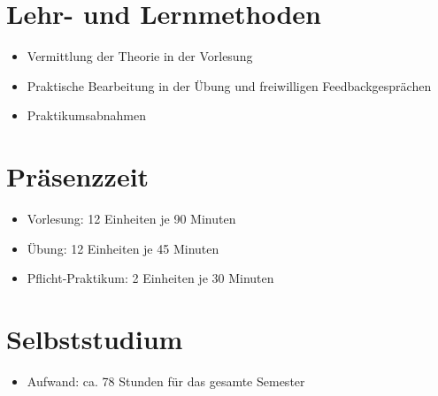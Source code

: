 \hypertarget{lehr--und-lernmethodenpathlabel....srcmodulbeschreibungen-bachelor-bpo5ba_datenbanksysteme}{%
\section*{Lehr- und
Lernmethoden\label{../../src/modulbeschreibungen-bachelor-bpo5/BA_Datenbanksysteme}}\label{lehr--und-lernmethodenpathlabel....srcmodulbeschreibungen-bachelor-bpo5ba_datenbanksysteme}}

\begin{itemize}
\tightlist
\item
  Vermittlung der Theorie in der Vorlesung
\item
  Praktische Bearbeitung in der Übung und freiwilligen
  Feedbackgesprächen
\item
  Praktikumsabnahmen
\end{itemize}

\hypertarget{pruxe4senzzeitpathlabel....srcmodulbeschreibungen-bachelor-bpo5ba_datenbanksysteme}{%
\section*{Präsenzzeit\label{../../src/modulbeschreibungen-bachelor-bpo5/BA_Datenbanksysteme}}\label{pruxe4senzzeitpathlabel....srcmodulbeschreibungen-bachelor-bpo5ba_datenbanksysteme}}

\begin{itemize}
\tightlist
\item
  Vorlesung: 12 Einheiten je 90 Minuten
\item
  Übung: 12 Einheiten je 45 Minuten
\item
  Pflicht-Praktikum: 2 Einheiten je 30 Minuten
\end{itemize}

\hypertarget{selbststudiumpathlabel....srcmodulbeschreibungen-bachelor-bpo5ba_datenbanksysteme}{%
\section*{Selbststudium\label{../../src/modulbeschreibungen-bachelor-bpo5/BA_Datenbanksysteme}}\label{selbststudiumpathlabel....srcmodulbeschreibungen-bachelor-bpo5ba_datenbanksysteme}}

\begin{itemize}
\tightlist
\item
  Aufwand: ca. 78 Stunden für das gesamte Semester
\end{itemize}

